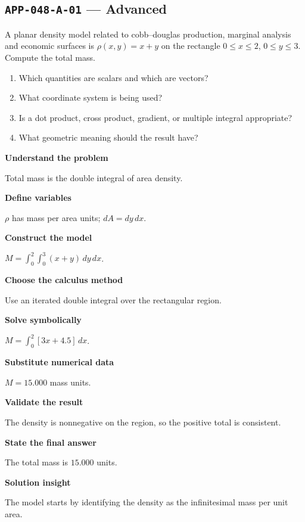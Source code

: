 \documentclass[11pt]{book}
\newcommand{\pid}[1]{\texttt{#1}}
\begin{document}
\subsection*{\pid{APP-048-A-01} — Advanced}
\begin{problembox}
A planar density model related to cobb–douglas production, marginal analysis and economic surfaces is $\rho(x,y)=x+y$ on the rectangle $0\le x\le 2$, $0\le y\le 3$. Compute the total mass.
\end{problembox}
\begin{promptbox}\begin{enumerate}
\item Which quantities are scalars and which are vectors?
\item What coordinate system is being used?
\item Is a dot product, cross product, gradient, or multiple integral appropriate?
\item What geometric meaning should the result have?
\end{enumerate}\end{promptbox}
\begin{solutionbox}
\textbf{Understand the problem}\par Total mass is the double integral of area density.\par\medskip
\textbf{Define variables}\par $\rho$ has mass per area units; $dA=dy\,dx$.\par\medskip
\textbf{Construct the model}\par $M=\int_0^{2}\int_0^{3}(x+y)\,dy\,dx$.\par\medskip
\textbf{Choose the calculus method}\par Use an iterated double integral over the rectangular region.\par\medskip
\textbf{Solve symbolically}\par $M=\int_0^{2}[3x+4.5]\,dx$.\par\medskip
\textbf{Substitute numerical data}\par $M=15.000$ mass units.\par\medskip
\textbf{Validate the result}\par The density is nonnegative on the region, so the positive total is consistent.\par\medskip
\textbf{State the final answer}\par The total mass is $15.000$ units.\par\medskip
\textbf{Solution insight}\par The model starts by identifying the density as the infinitesimal mass per unit area.\par\medskip
\end{solutionbox}
\end{document}

